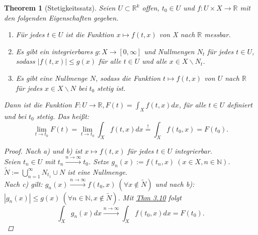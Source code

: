 \documentclass[a4paper]{report}
\newcommand{\R}{\mathbb{R}}
\newcommand{\N}{\mathbb{N}}
\newcommand{\jlabel}[1]{\label{j_#1}}
\newcommand{\jhyperref}[2]{\hyperref[j_#1]{#2}}
\newcommand{\jlink}[1]{\jhyperref{#1}{#1}}
\newcommand{\jabb}[3]{ #1: #2 \rightarrow #3 }
\theoremstyle{plain}
\newtheorem{thm}{Theorem}[chapter]
\theoremstyle{definition}
\begin{document}
{{{{\begin{thm}[Stetigkeitssatz]
\jlabel{Thm 3.14}
\jlabel{Stetigkeitssatz}
    Seien $U\subset \R^k$ offen, $t_0 \in U$ und $\jabb{f}{U\times X}{\R}$ mit den folgenden Eigenschaften gegeben.
    \begin{enumerate}
        \item Für jedes $t\in U$ ist die Funktion $x \mapsto f(t,x)$ von X nach $\R$ messbar.
        \item Es gibt ein integrierbares $\jabb{g}{X}{[0,\infty]}$ und Nullmengen $N_t$ für jedes $t \in U$, sodass $|f(t,x)| \le g(x)$ für alle $t\in U$ und alle $x\in X\backslash N_t$.
        \item Es gibt eine Nullmenge $N$, sodass die Funktion $t \mapsto f(t,x)$ von $U$ nach $\R$ für jedes $x \in X\backslash N$ bei $t_0$ stetig ist.
    \end{enumerate}
    Dann ist die Funktion $\jabb{F}{U}{\R}, F(t) = \int_X f(t,x)dx$, für alle $t\in U$ definiert und bei $t_0$ stetig. Das heißt:
    \begin{displaymath}
        \lim_{t\rightarrow t_0} F(t) = \lim_{t\rightarrow t_0} \int_X f(t,x)dx \overset{!}{=} \int_X f(t_0,x) = F(t_0).
    \end{displaymath}
    \begin{proof}
        Nach a) und b) ist $x \mapsto f(t,x)$ für jedes $t\in U$ integrierbar.\\
        Seien $t_n\in U$ mit $t_n \xrightarrow{n\rightarrow \infty} t_0$. Setze $g_n(x) := f(t_n,x)\ (x\in X, n\in \N)$.\\
        $\tilde{N} := \bigcup_{n=1}^\infty N_{t_1} \cup N$ ist eine Nullmenge.\\
        Nach c) gilt: $g_n(x) \xrightarrow{n\rightarrow \infty} f(t_0,x) \ (\forall x \notin \tilde{N})$ und nach b):\\
        $|g_n(x)| \le g(x) \ (\forall n\in \N, x \notin \tilde{N})$. Mit \jlink{Thm 3.10} folgt
        \begin{displaymath}
            \int_X g_n(x)dx \xrightarrow{n \rightarrow \infty} \int_X f(t_0,x) dx = F(t_0).
        \end{displaymath}
    \end{proof}
\end{thm}

}}}}
\end{document}
